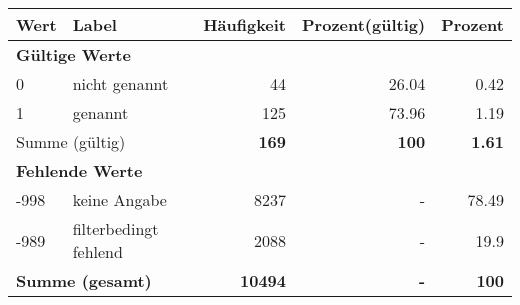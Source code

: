      \begin{longtable}{lXrrr}
     \toprule
     \textbf{Wert} & \textbf{Label} & \textbf{Häufigkeit} & \textbf{Prozent(gültig)} & \textbf{Prozent} \\
     \endhead
     \midrule
     \multicolumn{5}{l}{\textbf{Gültige Werte}}\\

     0 &
     \multicolumn{1}{X}{ nicht genannt   } &


       \num{44} &
       \num[round-mode=places,round-precision=2]{26,04} &
         \num[round-mode=places,round-precision=2]{0,42} \\

     1 &
     \multicolumn{1}{X}{ genannt   } &


       \num{125} &
       \num[round-mode=places,round-precision=2]{73,96} &
         \num[round-mode=places,round-precision=2]{1,19} \\
     \midrule
     \multicolumn{2}{l}{Summe (gültig)} &
       \textbf{\num{169}} &
     \textbf{100} &
       \textbf{\num[round-mode=places,round-precision=2]{1,61}} \\
     \multicolumn{5}{l}{\textbf{Fehlende Werte}}\\
       -998 &
       keine Angabe &
         \num{8237} &
        - &
         \num[round-mode=places,round-precision=2]{78,49} \\
       -989 &
       filterbedingt fehlend &
         \num{2088} &
        - &
         \num[round-mode=places,round-precision=2]{19,9} \\
     \midrule
     \multicolumn{2}{l}{\textbf{Summe (gesamt)}} &
          \textbf{\num{10494}} &
        \textbf{-} &
        \textbf{100} \\
     \bottomrule
     \end{longtable}
     
